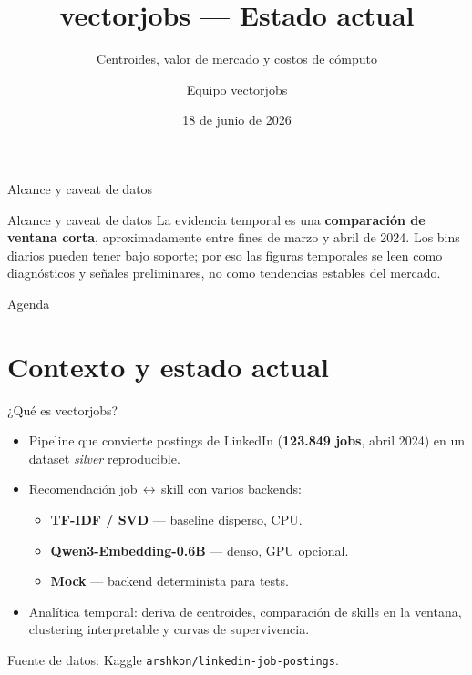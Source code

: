 \documentclass[aspectratio=169]{beamer}
\title[vectorjobs]{vectorjobs --- Estado actual}
\subtitle{Centroides, valor de mercado y costos de cómputo}
\author{Equipo vectorjobs}
\institute{Pipeline de recomendación job\,$\leftrightarrow$\,skill}
\date{18 de junio de 2026}
\begin{document}
\begin{frame}
  \titlepage
\end{frame}

\begin{frame}{Alcance y caveat de datos}
  \begin{block}{Alcance y caveat de datos}
    La evidencia temporal es una \textbf{comparación de ventana corta}, aproximadamente
    entre fines de marzo y abril de 2024. Los bins diarios pueden tener bajo
    soporte; por eso las figuras temporales se leen como diagnósticos y señales
    preliminares, no como tendencias estables del mercado.
  \end{block}
\end{frame}

\begin{frame}{Agenda}
  \tableofcontents
\end{frame}

\section{Contexto y estado actual}

\begin{frame}{¿Qué es vectorjobs?}
  \begin{itemize}
    \item Pipeline que convierte postings de LinkedIn (\textbf{123.849 jobs},
          abril 2024) en un dataset \emph{silver} reproducible.
    \item Recomendación job\,$\leftrightarrow$\,skill con varios backends:
      \begin{itemize}
        \item \textbf{TF-IDF / SVD} --- baseline disperso, CPU.
        \item \textbf{Qwen3-Embedding-0.6B} --- denso, GPU opcional.
        \item \textbf{Mock} --- backend determinista para tests.
      \end{itemize}
    \item Analítica temporal: deriva de centroides, comparación de skills en la ventana,
          clustering interpretable y curvas de supervivencia.
  \end{itemize}
  \vfill
  \footnotesize Fuente de datos: Kaggle \texttt{arshkon/linkedin-job-postings}.
\end{frame}
\end{document}

